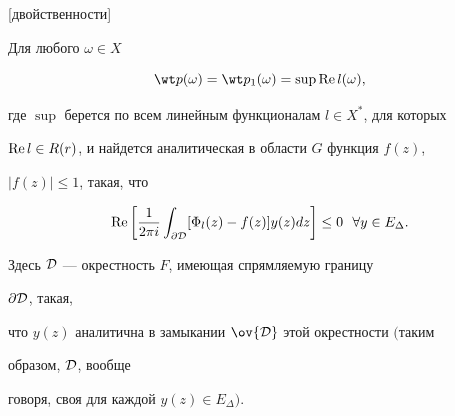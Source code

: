 

 


\begin{thms} 


[{\selectfont двойственности}]


Для любого $\omega\in X$ 


\begin{equation} 


\wt p(\omega)=\wt p_1(\omega)=\sup\re l(\omega), 


\end{equation} 


где $\sup$ берется по всем линейным функционалам $l\in X^*$, для которых 


$\operatorname{Re} l\in R(r)$, и найдется аналитическая в области $G$ функция $f(z)$, 


$|f(z)|\le1$, такая, что 


\begin{equation} 


\re\bigg[\frac{1}{2\pi i}\int_{\partial\cal D} 


[\Phi_l(z)-f(z)]y(z)d z\bigg]\le0\ \ \forall y\in E_\Delta. 


\end{equation} 


Здесь $\cal D$ --- окрестность $F$, имеющая спрямляемую границу 


$\partial\cal D$, такая, 


что $y(z)$ аналитична в замыкании $\ov{\cal D}$ этой окрестности $($таким 


образом, $\cal D$, вообще 


говоря, своя для каждой $y(z)\in E_\Delta)$. 


\end{thms} 


